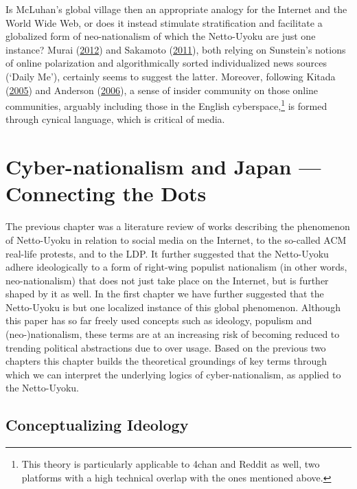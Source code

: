 \documentclass[10pt,british,A4paper,twoside]{memoir}
\begin{document}
Is McLuhan's global village then an appropriate analogy for the Internet
and the World Wide Web, or does it instead stimulate stratification and
facilitate a globalized form of neo-nationalism of which the Netto-Uyoku
are just one instance? Murai
(\protect\hyperlink{ref-murai_net_2012}{2012}) and Sakamoto
(\protect\hyperlink{ref-sakamoto_koreans_2011}{2011}), both relying on
Sunstein's notions of online polarization and algorithmically sorted individualized
news sources (`Daily Me'), certainly seems to suggest the latter.
Moreover, following Kitada
(\protect\hyperlink{ref-kitada_eng:_2005}{2005}) and Anderson
(\protect\hyperlink{ref-anderson_imagined_2006}{2006}), a sense of
insider community on those online communities, arguably including those
in the English cyberspace,\footnote{This theory is particularly
  applicable to 4chan and Reddit as well, two platforms with a high
  technical overlap with the ones mentioned above.} is formed through
cynical language, which is critical of media.

\chapter{Cyber-nationalism and Japan --- Connecting the
Dots}\label{cyber-nationalism-and-japan-connecting-the-dots}

The previous chapter was a literature review of works describing the
phenomenon of Netto-Uyoku in relation to social media on the Internet, to
the so-called ACM real-life protests, and to the LDP. It further suggested
that the Netto-Uyoku adhere ideologically to a form of right-wing
populist nationalism (in other words, neo-nationalism) that does not
just take place on the Internet, but is further shaped by it as well. In
the first chapter we have further suggested that the Netto-Uyoku is but one
localized instance of this global phenomenon. Although this paper has so
far freely used concepts such as ideology, populism and
(neo-)nationalism, these terms are at an increasing risk of becoming
reduced to trending political abstractions due to over usage. Based on
the previous two chapters this chapter builds the theoretical groundings
of key terms through which we can interpret the underlying logics of
cyber-nationalism, as applied to the Netto-Uyoku.

\section{Conceptualizing Ideology}\label{conceptualizing-ideology}
\end{document}

